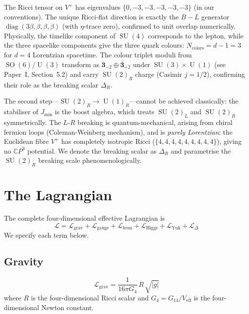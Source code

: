 \documentclass[12pt,a4paper]{article}
\theoremstyle{definition}
\newcommand{\SO}{\operatorname{SO}}
\newcommand{\SU}{\operatorname{SU}}
\newcommand{\U}{\operatorname{U}}
\newcommand{\diag}{\operatorname{diag}}
\newcommand{\CP}{\mathbb{C}P}
\begin{document}
The Ricci tensor on $V^+$ has eigenvalues $\{0, -3, -3, -3, -3, -3\}$ (in our conventions).
The unique Ricci-flat direction is exactly the $B{-}L$ generator $\diag(3\beta, \beta, \beta, \beta)$ (with $\eta$-trace zero), confirmed to unit overlap numerically.
Physically, the timelike component of $\SU(4)$ corresponds to the lepton, while the three spacelike components give the three quark colours: $N_{\mathrm{colors}} = d - 1 = 3$ for $d = 4$ Lorentzian spacetime.
The colour triplet moduli from $\SO(6)/\U(3)$ transform as $\mathbf{3}_{-2} \oplus \bar{\mathbf{3}}_{+2}$ under $\SU(3) \times \U(1)$ (see Paper~I, Section~5.2) and carry $\SU(2)_R$ charge (Casimir $j = 1/2$), confirming their role as the breaking scalar $\Delta_R$.

The second step---$\SU(2)_R \to \U(1)_R$---cannot be achieved classically: the stabiliser of $J_{\min}$ is the boost algebra, which treats $\SU(2)_L$ and $\SU(2)_R$ symmetrically.
The $L$-$R$ breaking is quantum-mechanical, arising from chiral fermion loops (Coleman-Weinberg mechanism), and is \emph{purely Lorentzian}: the Euclidean fibre $V^+$ has completely isotropic Ricci ($\{4,4,4,4,4,4,4,4,4\}$), giving no $\CP^3$ potential.
We denote the breaking scalar as $\Delta_R$ and parametrise the $\SU(2)_R$ breaking scale phenomenologically.


\section{The Lagrangian}
\label{sec:lagrangian}

The complete four-dimensional effective Lagrangian is
\begin{equation}
\label{eq:full_lagrangian}
\boxed{
\mathcal{L} = \mathcal{L}_{\mathrm{grav}} + \mathcal{L}_{\mathrm{gauge}} + \mathcal{L}_{\mathrm{ferm}} + \mathcal{L}_{\mathrm{Higgs}} + \mathcal{L}_{\mathrm{Yuk}} + \mathcal{L}_{\Delta}
}
\end{equation}
We specify each term below.

\subsection{Gravity}

\begin{equation}
\label{eq:L_grav}
\mathcal{L}_{\mathrm{grav}} = \frac{1}{16\pi G_4}\, R\, \sqrt{|g|}
\end{equation}
where $R$ is the four-dimensional Ricci scalar and $G_4 = G_{14}/V_{\mathrm{eff}}$ is the four-dimensional Newton constant.
\end{document}
